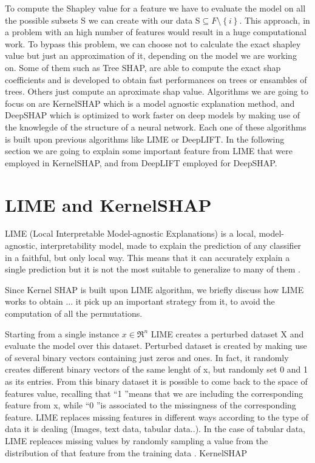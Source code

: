 \documentclass[10pt]{report}
\begin{document}
To compute the Shapley value for a feature we have to evaluate the model on all the possible subsets S we can create with our data S$\subseteq F \setminus \left\{i\right\}$. This approach, in a problem with an high number of features would result in a huge computational work. To bypass this problem, we can choose not to calculate the exact shapley value but just an approximation of it, depending on the model we are working on. Some of them such as Tree SHAP, are able to compute the exact shap coefficients and is developed to obtain fast performances on trees or ensambles of trees.
Others just compute an aproximate shap value. Algorithms we are going to focus on are KernelSHAP which is a model agnostic explanation method, and DeepSHAP which is optimized to work faster on deep models by making use of the knowlegde of the structure of a neural network.
Each one of these algorithms is built upon previous algorithms like LIME or DeepLIFT. In the following section we are going to explain some important feature from LIME that were employed in KernelSHAP, and from DeepLIFT employed for DeepSHAP.

\section{LIME and KernelSHAP}\label{sec:lime}\hfill

LIME (Local Interpretable Model-agnostic Explanations) is a local, model-agnostic, interpretability model, made to explain the prediction of any classifier in a faithful, but only local way. This means that it can accurately explain a single prediction but it is not the most suitable to generalize to many of them \cite{ribeiro-2016}.

Since Kernel SHAP is built upon LIME algorithm, we briefly discuss how LIME works to obtain ...
it pick up an important strategy from it, to avoid the computation of all the permutations.

Starting from a single instance  $x \in \Re^n$  LIME creates a perturbed dataset X and evaluate the model over this dataset.
Perturbed dataset is created by making use of several binary vectors containing just zeros and ones. In fact, it randomly creates different binary vectors of the same lenght of x, but randomly set 0 and 1 as its entries.
From this binary dataset it is possible to come back to the space of features value, recalling that \textquotedblleft 1 \textquotedblright means that we are including the corresponding feature from x, while \textquotedblleft 0 \textquotedblright is associated to the missingness of the corresponding feature.
LIME replaces missing features in different ways according to the type of data it is dealing (Images, text data, tabular data..).
In the case of tabular data, LIME repleaces missing values by randomly sampling a value from the distribution of that feature from the training data  \cite{ferrando2018}.
KernelSHAP
\end{document}
